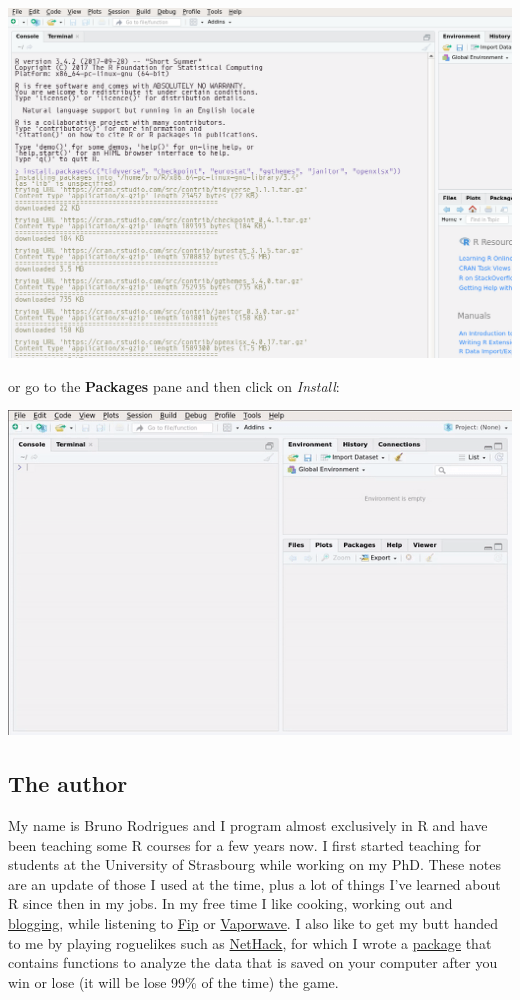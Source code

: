 \documentclass[]{gitbook}
\begin{document}
\includegraphics[width=14.9in]{pics/install_packages}

or go to the \textbf{Packages} pane and then click on \emph{Install}:

\includegraphics{pics/rstudio_install_packages.gif}

\hypertarget{the-author}{%
\subsection*{The author}\label{the-author}}

My name is Bruno Rodrigues and I program almost exclusively in R and have been teaching some R
courses for a few years now. I first started teaching for students at the University of Strasbourg
while working on my PhD.
These notes are an update of those I used at the time, plus a lot of things I've learned about R
since then in my jobs.
In my free time I like cooking, working out and \href{https://www.brodrigues.co}{blogging}, while listening to
\href{http://www.fipradio.fr/player}{Fip} or \href{https://www.youtube.com/watch?v=u5qwtO_ABPM}{Vaporwave}.
I also like to get my butt handed to me by playing roguelikes
such as \href{http://nethack.wikia.com/wiki/NetHack}{NetHack}, for which I wrote a
\href{https://github.com/b-rodrigues/nethack}{package} that contains functions to analyze the data that
is saved on your computer after you win or lose (it will be lose 99\% of the time) the game.
\end{document}
